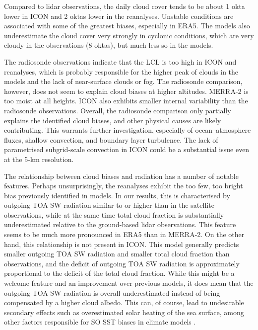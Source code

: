 \documentclass[12pt,a4paper]{article}
\begin{document}
Compared to lidar observations, the daily cloud cover tends to be about 1 okta
lower in ICON and 2 oktas lower in the reanalyses.  Unstable conditions are
associated with some of the greatest biases, especially in ERA5.  The models
also underestimate the cloud cover very strongly in cyclonic conditions, which
are very cloudy in the observations (8 oktas), but much less so in the models.

The radiosonde observations indicate that the LCL is too high in ICON and
reanalyses, which is probably responsible for the higher peak of clouds in the
models and the lack of near-surface clouds or fog. The radiosonde comparison,
however, does not seem to explain cloud biases at higher altitudes.  MERRA-2 is
too moist at all heights.  ICON also exhibits smaller internal variability than
the radiosonde observations. Overall, the radiosonde comparison only
partially explains the identified cloud biases, and other physical causes are
likely contributing.  This warrants further investigation, especially of
ocean--atmosphere fluxes, shallow convection, and boundary layer turbulence.
The lack of parametrised subgrid-scale convection in ICON could be a
substantial issue even at the 5-km resolution.

The relationship between cloud biases and radiation has a number of notable
features. Perhaps unsurprisingly, the reanalyses exhibit the too few, too
bright bias previously identified in models. In our results, this is
characterised by outgoing TOA SW radiation similar to or higher than in the
satellite observations, while at the same time total cloud fraction is
substantially underestimated relative to the ground-based lidar observations.
This feature seems to be much more pronounced in ERA5 than in MERRA-2. On the
other hand, this relationship is not present in ICON. This model generally
predicts smaller outgoing TOA SW radiation and smaller total cloud fraction
than observations, and the deficit of outgoing TOA SW radiation is
approximately proportional to the deficit of the total cloud fraction. While this
might be a welcome feature and an improvement over previous models, it does
mean that the outgoing TOA SW radiation is overall underestimated instead of
being compensated by a higher cloud albedo. This can, of course, lead to
undesirable secondary effects such as overestimated solar heating of the sea
surface, among other factors responsible for SO SST biases in climate models
\citep{zhang2023,luo2023,hyder2018}.
\end{document}
